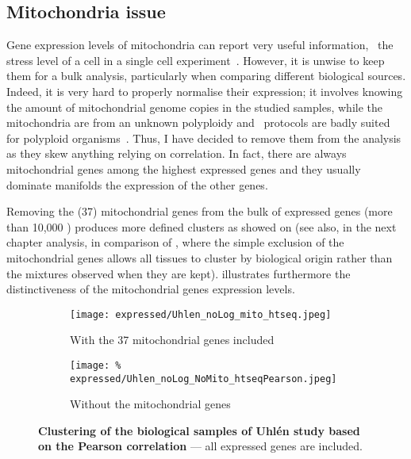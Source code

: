 \subsection{Mitochondria issue}\label{subsec:mito}

Gene expression levels of mitochondria can report very useful information,
\eg\ the stress level of a cell in a single cell experiment~.
However, it is unwise to keep them for a bulk analysis, particularly when
comparing different biological sources.
Indeed, it is very hard to properly normalise their expression;
it involves knowing the amount of mitochondrial genome copies
in the studied samples, while the mitochondria are from an unknown polyploidy
and \Rnaseq\ protocols are badly suited for polyploid organisms~.
Thus, I have decided to remove them from the analysis as they skew anything relying
on correlation.
In fact, there are always mitochondrial genes among the highest expressed genes
and they usually dominate manifolds the expression of the other genes.

Removing the (37) mitochondrial genes from the bulk of expressed genes
(more than 10,000 \pcgs) produces more defined clusters as showed on
(see also, in the next chapter analysis,
 in comparison of ,
where the simple exclusion of the mitochondrial genes allows all tissues
to cluster by biological origin rather than the mixtures observed
when they are kept).
 illustrates furthermore the distinctiveness
of the mitochondrial genes expression levels.

\begin{figure}[!htbp]
    \centering
    \begin{subfigure}[hp]{0.85\textwidth}
        \centering
        \texttt{[image: expressed/Uhlen\_noLog\_mito\_htseq.jpeg]}
        \caption{With the 37 mitochondrial genes included}\label{fig:withMito}
    \end{subfigure}

    \begin{subfigure}[hp]{0.85\textwidth}
        \centering
        \texttt{[image: \%
            expressed/Uhlen\_noLog\_NoMito\_htseqPearson.jpeg]}
        \caption{Without the mitochondrial genes}\label{fig:NoMito}
    \end{subfigure}
    \caption[Clustering of the biological samples of \uhlen\
    dataset based on the Pearson correlation]{\label{fig:MitoNomito}\textbf{Clustering
    of the biological samples of Uhlén study based on the Pearson correlation}
    --- all expressed genes are included.}
\end{figure}

